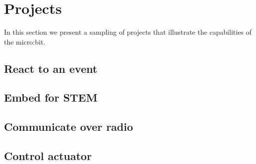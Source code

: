 \section{Projects}
\label{sec:}

In this section we present a sampling of projects that 
illustrate the capabilities of the micro:bit. 

\subsection{React to an event}





\subsection{Embed for STEM}


\subsection{Communicate over radio}





\subsection{Control actuator}


